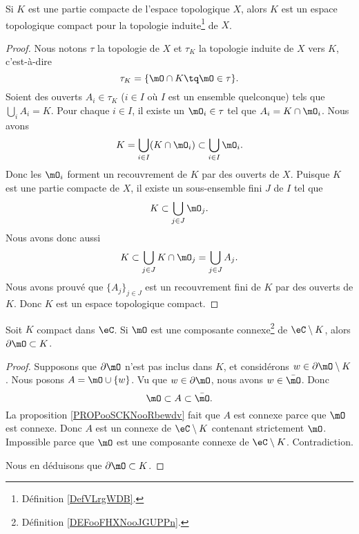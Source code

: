 \begin{lemma}       \label{LEMooVYTRooKTIYdn}
	Si \( K\) est une partie compacte de l'espace topologique \( X\), alors \( K\) est un espace topologique compact pour la topologie induite\footnote{Définition \ref{DefVLrgWDB}.} de \( X\).
\end{lemma}

\begin{proof}
	Nous notons \( \tau\) la topologie de \( X\) et \( \tau_K\) la topologie induite de \( X\) vers \( K\), c'est-à-dire
	\begin{equation}
		\tau_K=\{ \mO\cap K\tq \mO\in\tau \}.
	\end{equation}
	Soient des ouverts \( A_i\in \tau_K\) (\( i\in I\) où \( I\) est un ensemble quelconque) tels que \( \bigcup_iA_i=K\). Pour chaque \( i\in I\), il existe un \( \mO_i\in \tau\) tel que \( A_i=K\cap\mO_i\). Nous avons
	\begin{equation}
		K=\bigcup_{i\in I}(K\cap\mO_i)\subset\bigcup_{i\in I}\mO_i.
	\end{equation}
	Donc les \( \mO_i\) forment un recouvrement de \( K\) par des ouverts de \( X\). Puisque \( K\) est une partie compacte de \( X\), il existe un sous-ensemble fini \( J\) de \( I\) tel que
	\begin{equation}
		K\subset\bigcup_{j\in J}\mO_j.
	\end{equation}
	Nous avons donc aussi
	\begin{equation}
		K\subset\bigcup_{j\in J}K\cap\mO_j=\bigcup_{j\in J}A_j.
	\end{equation}
	Nous avons prouvé que \( \{ A_j \}_{j\in J}\) est un recouvrement fini de \( K\) par des ouverts de \( K\). Donc \( K\) est un espace topologique compact.
\end{proof}

\begin{proposition}       \label{PROPooOXKSooEDzCRZ}
	Soit \( K\) compact dans \( \eC\). Si \( \mO\) est une composante connexe\footnote{Définition \ref{DEFooFHXNooJGUPPn}.} de \( \eC\setminus K\), alors \( \partial \mO\subset K\).
\end{proposition}

\begin{proof}
	Supposons que \( \partial\mO\) n'est pas inclus dans \( K\), et considérons \( w\in\partial\mO\setminus K\). Nous posons \( A=\mO\cup\{ w \}\). Vu que \( w\in\partial\mO\), nous avons \( w\in\bar\mO\). Donc
	\begin{equation}
		\mO\subset A\subset\bar\mO.
	\end{equation}
	La proposition \ref{PROPooSCKNooRbewdv} fait que \( A\) est connexe parce que \( \mO\) est connexe. Donc \( A\) est un connexe de \( \eC\setminus K\) contenant strictement \( \mO\). Impossible parce que \( \mO\) est une composante connexe de \( \eC\setminus K\). Contradiction.

	Nous en déduisons que \( \partial\mO\subset K\).
\end{proof}



